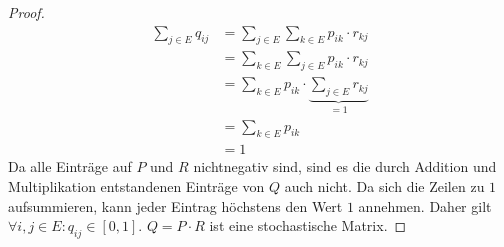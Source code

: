 \documentclass[a4paper]{scrartcl}
\def \blattnr {2}
\begin{document}
\begin{enumerate}[label=\bfseries \blattnr.\arabic*]
\begin{enumerate}[label=\alph*)]
\begin{proof}
                    \begin{equation*}
                        \begin{split}
                            \sum_{j \in E} q_{ij}
                            &= \sum_{j \in E} \sum_{k \in E}
                                p_{ik} \cdot r_{kj} \\
                            &= \sum_{k \in E} \sum_{j \in E}
                                p_{ik} \cdot r_{kj} \\
                            &= \sum_{k \in E} p_{ik} \cdot
                                \underbrace{\sum_{j \in E} r_{kj}}_{= 1} \\
                            &= \sum_{k \in E} p_{ik} \\
                            &= 1
                        \end{split}
                    \end{equation*}
                    Da alle Einträge auf $P$ und $R$ nichtnegativ sind, sind
                    es die durch Addition und Multiplikation entstandenen
                    Einträge von $Q$ auch nicht.
                    Da sich die Zeilen zu $1$ aufsummieren, kann jeder Eintrag
                    höchstens den Wert $1$ annehmen.
                    Daher gilt $\forall i,j \in E : q_{ij} \in [0,1]$.
                    $Q = P \cdot R$ ist eine stochastische Matrix.
                \end{proof}


\end{enumerate}
\end{enumerate}
\end{document}
